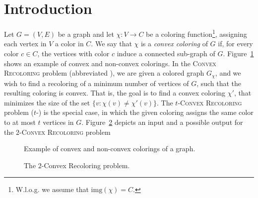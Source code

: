 
\section{Introduction}

Let $G = (V, E)$ be a graph and let $\chi : V \rightarrow C$ be a
coloring function\footnote{
W.l.o.g. we assume that $\text{img}(\chi) = C$.
}, assigning each vertex in $V$ a color in $C$.  We
say that $\chi$ is a \emph{convex coloring} of $G$ if, for every color
$c \in C$, the vertices with color $c$ induce a connected sub-graph of
$G$. Figure~\ref{fig:convex} shows an example of convex and non-convex colorings.
%
In the \textsc{Convex Recoloring} problem (abbreviated \CRP{}), 
we are given a colored graph $G_\chi$,
and we wish to find a recoloring of a minimum number of vertices of $G$,
such that the resulting coloring is convex. 
That is,
the goal is to find a convex coloring $\chi'$,
that minimizes the size of the set $\{v : \chi(v) \neq \chi'(v)\}$.
%
The \textsc{$t$-Convex Recoloring} problem ($t$-\CRP{}) is the special
case, in which the given coloring assigns the same color to at most
$t$ vertices in $G$.
Figure~\ref{fig:input-output} depicts an input and a possible output for the 
\textsc{$2$-Convex Recoloring} problem

\begin{figure}
\centering

\caption{
\label{fig:convex}
Example of convex and non-convex colorings of a graph.}
\end{figure}

\begin{figure}
\centering

\caption{
\label{fig:input-output}
The $2$-Convex Recoloring problem.
}
\end{figure}


